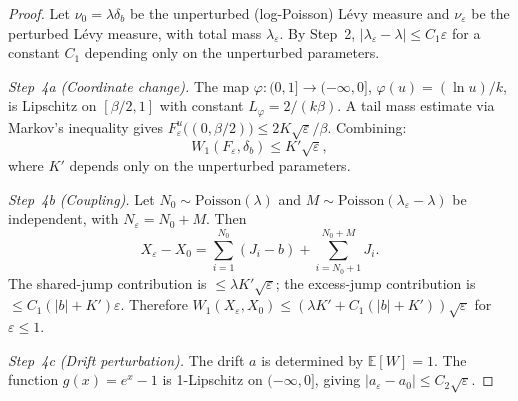 \documentclass[12pt]{amsart}
\theoremstyle{definition}
\theoremstyle{remark}
\begin{document}
\begin{proof}
Let $\nu_0 = \lambda\delta_b$ be the unperturbed (log-Poisson) L\'evy
measure and $\nu_\varepsilon$ be the perturbed L\'evy measure, with
total mass $\lambda_\varepsilon$.  By Step~2,
$|\lambda_\varepsilon - \lambda| \leq C_1\varepsilon$ for a constant
$C_1$ depending only on the unperturbed parameters.

\textit{Step~4a (Coordinate change).}  The map $\varphi\colon (0,1]
\to (-\infty,0]$, $\varphi(u) = (\ln u)/k$, is Lipschitz on
$[\beta/2, 1]$ with constant $L_\varphi = 2/(k\beta)$.  A tail mass
estimate via Markov's inequality gives
$F_\varepsilon^u\bigl((0,\beta/2)\bigr) \leq 2K\sqrt{\varepsilon}/
\beta$.  Combining:
\[
  W_1(F_\varepsilon, \delta_b) \leq K'\sqrt{\varepsilon},
\]
where $K'$ depends only on the unperturbed parameters.

\textit{Step~4b (Coupling).}  Let
$N_0 \sim \mathrm{Poisson}(\lambda)$ and
$M \sim \mathrm{Poisson}(\lambda_\varepsilon - \lambda)$
be independent, with $N_\varepsilon = N_0 + M$.  Then
\[
  X_\varepsilon - X_0
  = \sum_{i=1}^{N_0}(J_i - b)
  + \sum_{i=N_0+1}^{N_0+M} J_i.
\]
The shared-jump contribution is $\leq \lambda K'\sqrt{\varepsilon}$;
the excess-jump contribution is $\leq C_1(|b|+K')\varepsilon$.
Therefore $W_1(X_\varepsilon, X_0) \leq (\lambda K' + C_1(|b| +
K'))\sqrt{\varepsilon}$ for $\varepsilon \leq 1$.

\textit{Step~4c (Drift perturbation).}  The drift $a$ is determined
by $\mathbb{E}[W] = 1$.  The function $g(x) = e^x - 1$ is
1-Lipschitz on $(-\infty,0]$, giving $|a_\varepsilon - a_0| \leq
C_2\sqrt{\varepsilon}$.


\end{proof}
\end{document}
